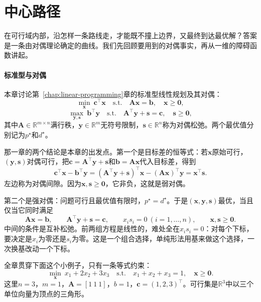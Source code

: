\section{中心路径}
\label{sec:lpipm-central-path}

在可行域内部，沿怎样一条路线走，才能既不撞上边界，又最终到达最优解？答案是一条由对偶理论确定的曲线。我们先回顾要用到的对偶事实，再从一维的障碍函数讲起。

\paragraph{标准型与对偶}
本章讨论第~\ref{chap:linear-programming}章的标准型线性规划及其对偶：
\begin{equation}
 \min_{\bm{x}}\ \bm{c}^\top\bm{x}\quad\text{s.t.}\quad\bm{A}\bm{x}=\bm{b},\quad\bm{x}\geq\bm{0},
 \label{eq:lpipm-primal}
\end{equation}
\begin{equation}
 \max_{\bm{y},\bm{s}}\ \bm{b}^\top\bm{y}\quad\text{s.t.}\quad\bm{A}^\top\bm{y}+\bm{s}=\bm{c},\quad\bm{s}\geq\bm{0},
 \label{eq:lpipm-dual}
\end{equation}
其中$\bm{A}\in\mathbb{R}^{m\times n}$满行秩，$\bm{y}\in\mathbb{R}^m$无符号限制，$\bm{s}\in\mathbb{R}^n$称为对偶松弛。两个最优值分别记为$p^\star$和$d^\star$。

那一章的两个结论是本章的出发点。第一个是目标差的恒等式：若$\bm{x}$原始可行，$(\bm{y},\bm{s})$对偶可行，把$\bm{c}=\bm{A}^\top\bm{y}+\bm{s}$和$\bm{b}=\bm{A}\bm{x}$代入目标差，得到
\begin{equation}
 \bm{c}^\top\bm{x}-\bm{b}^\top\bm{y}
 =(\bm{A}^\top\bm{y}+\bm{s})^\top\bm{x}-(\bm{A}\bm{x})^\top\bm{y}
 =\bm{x}^\top\bm{s}.
 \label{eq:lpipm-gap-identity}
\end{equation}
左边称为对偶间隙。因为$\bm{x},\bm{s}\geq\bm{0}$，它非负，这就是弱对偶。

第二个是强对偶：问题可行且最优值有限时，$p^\star=d^\star$。于是$(\bm{x},\bm{y},\bm{s})$最优，当且仅当它同时满足
\begin{equation}
 \bm{A}\bm{x}=\bm{b},\qquad\bm{A}^\top\bm{y}+\bm{s}=\bm{c},\qquad x_is_i=0\ (i=1,\ldots,n),\qquad\bm{x},\bm{s}\geq\bm{0}.
 \label{eq:lpipm-kkt}
\end{equation}
中间的条件是互补松弛。前两组方程是线性的，难处全在$x_is_i=0$：对每个下标，要决定是$x_i$为零还是$s_i$为零。这是一个组合选择，单纯形法用基来做这个选择，一次换基改动一个下标。

全章贯穿下面这个小例子，只有一条等式约束：
\begin{equation}
 \min_{\bm{x}}\ x_1+2x_2+3x_3\quad\text{s.t.}\quad x_1+x_2+x_3=1,\quad\bm{x}\geq\bm{0}.
 \label{eq:lpipm-running}
\end{equation}
这里$n=3$，$m=1$，$\bm{A}=[1\ 1\ 1]$，$b=1$，$\bm{c}=(1,2,3)^\top$。可行集是$\mathbb{R}^3$中以三个单位向量为顶点的三角形。

